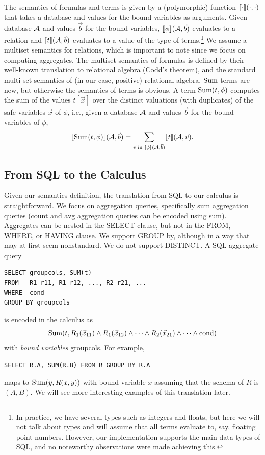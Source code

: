 The semantics of formulas and terms is given by a (polymorphic) function
$\lbrack\!\lbrack\cdot\rbrack\!\rbrack(\cdot, \cdot)$ that takes a database and values for the
bound variables as arguments. Given database $\db$ and values $\vec{b}$ for
the bound variables,
$\Bracks{\phi}(\db, \vec{b})$ evaluates to a relation and
$\Bracks{t}(\db, \vec{b})$ evaluates to a value of the type of
terms.\footnote{In practice,
we have several types such as integers and floats, but
here we will not talk about types and will assume that all terms evaluate to,
say, floating point numbers. However, our implementation supports the
main data types of SQL, and no noteworthy observations were made achieving
this.}
We assume a multiset semantics for relations, which is important to note
since we focus on computing aggregates. The multiset semantics of formulas
is defined by their well-known translation to relational algebra
(Codd's theorem), and the standard multi-set semantics of
(in our case, positive) relational algebra. 
$\mbox{Sum}$ terms are new, but otherwise the
semantics of terms is obvious.
A term $\mbox{Sum}(t, \phi)$
computes the sum of the values $t[\vec{x}]$
over the distinct valuations (with duplicates)
of the safe variables $\vec{x}$ of $\phi$, i.e.,
given a database $\db$ and values $\vec{b}$ for the bound variables of $\phi$,
\[
\Bracks{\AggSum(t, \phi)}(\db, \vec{b}) =
\sum_{\vec{v} \;\mathrm{in}\; \Bracks{\phi}(\db, \vec{b})} \Bracks{t}(\db, \vec{v}).
\]


\subsection{From SQL to the Calculus}


Given our semantics definition, the translation from SQL to our calculus is
straightforward. We focus on aggregation queries, specifically
sum aggregation queries (count and avg aggregation queries can be encoded
using sum). Aggregates can be nested in the SELECT clause, but not in
the FROM, WHERE, or HAVING clause. We support GROUP by, although in a way
that may at first seem nonstandard. We do not support DISTINCT.
A SQL aggregate query
\begin{verbatim}
SELECT groupcols, SUM(t)
FROM   R1 r11, R1 r12, ..., R2 r21, ...
WHERE  cond
GROUP BY groupcols
\end{verbatim}
is encoded in the calculus as
\[
\mbox{Sum}(t, R_1(\vec{x}_{11}) \land R_1(\vec{x}_{12}) \land \dots
\land R_2(\vec{x}_{21}) \land \dots \land \mbox{cond})
\]
with {\em bound variables} groupcols.
For example,
\begin{verbatim}
SELECT R.A, SUM(R.B) FROM R GROUP BY R.A
\end{verbatim}
maps to
$\mbox{Sum}(y, R(x,y))$ with bound variable $x$ assuming that the schema of
$R$ is $(A,B)$.
We will see more interesting examples of this translation later.


